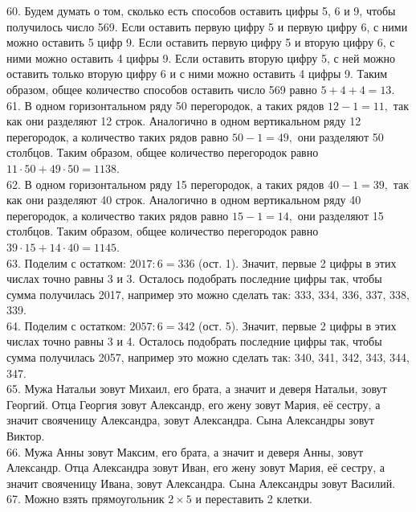 \documentclass[12pt]{article}
\begin{document}
60. Будем думать о том, сколько есть способов оставить цифры 5, 6 и 9, чтобы получилось число 569. Если оставить первую цифру 5 и первую цифру 6, с ними можно оставить 5 цифр 9. Если оставить первую цифру 5 и вторую цифру 6, с ними можно оставить 4 цифры 9. Если оставить вторую цифру 5, с ней можно оставить только вторую цифру 6 и с ними можно оставить 4 цифры 9. Таким образом, общее количество способов оставить число 569 равно $5+4+4=13.$\\
61. В одном горизонтальном ряду 50 перегородок, а таких рядов $12-1=11,$ так как они разделяют 12 строк. Аналогично в одном вертикальном ряду 12 перегородок, а количество таких рядов равно $50-1=49,$ они разделяют 50 столбцов. Таким образом, общее количество перегородок равно $11\cdot50+49\cdot50=1138.$\\
62. В одном горизонтальном ряду 15 перегородок, а таких рядов $40-1=39,$ так как они разделяют 40 строк. Аналогично в одном вертикальном ряду 40 перегородок, а количество таких рядов равно $15-1=14,$ они разделяют 15 столбцов. Таким образом, общее количество перегородок равно $39\cdot15+14\cdot40=1145.$\\
63. Поделим с остатком: $2017:6=336$ (ост. 1). Значит, первые 2 цифры в этих числах точно равны 3 и 3. Осталось подобрать последние цифры так, чтобы сумма получилась 2017, например это можно сделать так: 333, 334, 336, 337, 338, 339.\\
64. Поделим с остатком: $2057:6=342$ (ост. 5). Значит, первые 2 цифры в этих числах точно равны 3 и 4. Осталось подобрать последние цифры так, чтобы сумма получилась 2057, например это можно сделать так: 340, 341, 342, 343, 344, 347.\\
65. Мужа Натальи зовут Михаил, его брата, а значит и деверя Натальи, зовут Георгий. Отца Георгия зовут Александр, его жену зовут Мария, её сестру, а значит свояченицу Александра, зовут Александра. Сына Александры зовут Виктор.\\
66. Мужа Анны зовут Максим, его брата, а значит и деверя Анны, зовут Александр. Отца Александра зовут Иван, его жену зовут Мария, её сестру, а значит свояченицу Ивана, зовут Александра. Сына Александры зовут Василий.\\
67. Можно взять прямоугольник $2\times5$ и переставить 2 клетки.
\begin{center}
\begin{figure}[ht!]
\end{figure}
\end{center}
\end{document}
